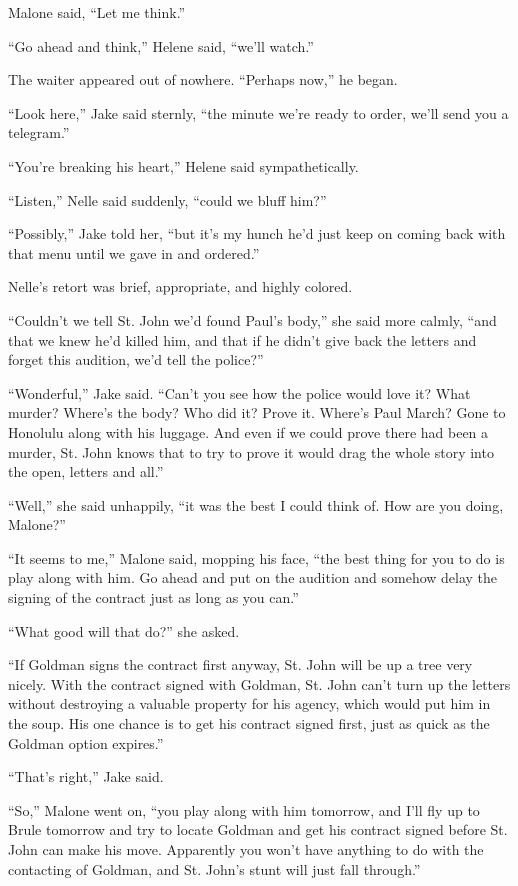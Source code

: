 \documentclass{novel}
\begin{document}
Malone said, “Let me think.”

“Go ahead and think,” Helene said, “we’ll watch.”

The waiter appeared out of nowhere. “Perhaps now,” he began.

“Look here,” Jake said sternly, “the minute we’re ready to order, we’ll send you a telegram.”

“You’re breaking his heart,” Helene said sympathetically.

“Listen,” Nelle said suddenly, “could we bluff him?”

“Possibly,” Jake told her, “but it’s my hunch he’d just keep on coming back with that menu until we gave in and ordered.”

Nelle’s retort was brief, appropriate, and highly colored.

“Couldn’t we tell St. John we’d found Paul’s body,” she said more calmly, “and that we knew he’d killed him, and that if he didn’t give back the letters and forget this audition, we’d tell the police?”

“Wonderful,” Jake said. “Can’t you see how the police would love it? What murder? Where’s the body? Who did it? Prove it. Where’s Paul March? Gone to Honolulu along with his luggage. And even if we could prove there had been a murder, St. John knows that to try to prove it would drag the whole story into the open, letters and all.”

“Well,” she said unhappily, “it was the best I could think of. How are you doing, Malone?”

“It seems to me,” Malone said, mopping his face, “the best thing for you to do is play along with him. Go ahead and put on the audition and somehow delay the signing of the contract just as long as you can.”

“What good will that do?” she asked.

“If Goldman signs the contract first anyway, St. John will be up a tree very nicely. With the contract signed with Goldman, St. John can’t turn up the letters without destroying a valuable property for his agency, which would put him in the soup. His one chance is to get his contract signed first, just as quick as the Goldman option expires.”

“That’s right,” Jake said.

“So,” Malone went on, “you play along with him tomorrow, and I’ll fly up to Brule tomorrow and try to locate Goldman and get his contract signed before St. John can make his move. Apparently you won’t have anything to do with the contacting of Goldman, and St. John’s stunt will just fall through.”
\end{document}
